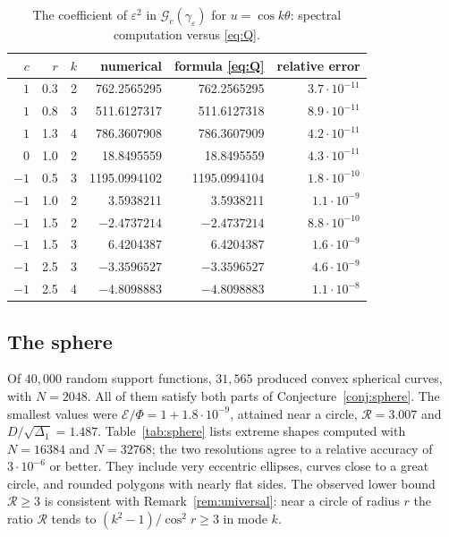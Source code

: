 \documentclass[11pt]{amsart}
\theoremstyle{definition}
\theoremstyle{remark}
\numberwithin{equation}{section}
\newcommand{\eps}{\varepsilon}
\newcommand{\E}{\mathcal{E}}
\newcommand{\G}{\mathcal{G}}
\begin{document}
\begin{table}[t]
\centering
\small
\caption{The coefficient of $\eps^2$ in $\G_c(\gamma_\eps)$ for $u=\cos k\theta$: spectral computation versus \eqref{eq:Q}.}
\label{tab:validation}
\begin{tabular}{rrrrrr}
\toprule
$c$ & $r$ & $k$ & numerical & formula \eqref{eq:Q} & relative error\\
\midrule
$1$ & 0.3 & 2 & 762.2565295 & 762.2565295 & $3.7\cdot10^{-11}$\\
$1$ & 0.8 & 3 & 511.6127317 & 511.6127318 & $8.9\cdot10^{-11}$\\
$1$ & 1.3 & 4 & 786.3607908 & 786.3607909 & $4.2\cdot10^{-11}$\\
$0$ & 1.0 & 2 & 18.8495559 & 18.8495559 & $4.3\cdot10^{-11}$\\
$-1$ & 0.5 & 3 & 1195.0994102 & 1195.0994104 & $1.8\cdot10^{-10}$\\
$-1$ & 1.0 & 2 & 3.5938211 & 3.5938211 & $1.1\cdot10^{-9}$\\
$-1$ & 1.5 & 2 & $-2.4737214$ & $-2.4737214$ & $8.8\cdot10^{-10}$\\
$-1$ & 1.5 & 3 & 6.4204387 & 6.4204387 & $1.6\cdot10^{-9}$\\
$-1$ & 2.5 & 3 & $-3.3596527$ & $-3.3596527$ & $4.6\cdot10^{-9}$\\
$-1$ & 2.5 & 4 & $-4.8098883$ & $-4.8098883$ & $1.1\cdot10^{-8}$\\
\bottomrule
\end{tabular}
\end{table}

\subsection{The sphere}
Of $40{,}000$ random support functions, $31{,}565$ produced convex spherical curves, with $N=2048$. All of them satisfy both parts of Conjecture~\ref{conj:sphere}. The smallest values were $\E/\Phi=1+1.8\cdot10^{-9}$, attained near a circle, $\mathcal R=3.007$ and $D/\sqrt{\Delta_1}=1.487$. Table~\ref{tab:sphere} lists extreme shapes computed with $N=16384$ and $N=32768$; the two resolutions agree to a relative accuracy of $3\cdot10^{-6}$ or better. They include very eccentric ellipses, curves close to a great circle, and rounded polygons with nearly flat sides. The observed lower bound $\mathcal R\ge3$ is consistent with Remark~\ref{rem:universal}: near a circle of radius $r$ the ratio $\mathcal R$ tends to $(k^2-1)/\cos^2r\ge3$ in mode $k$.
\end{document}
